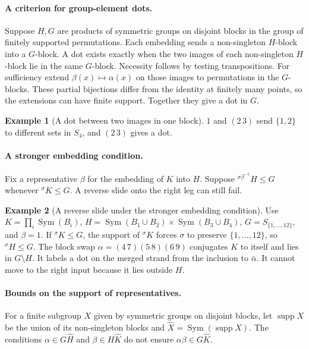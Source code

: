 \documentclass[11pt,a4paper]{article}
\numberwithin{equation}{section}
\theoremstyle{definition}
\newtheorem{example}{Example}[section]
\newcommand{\cg}[2]{{}^{#1}\!#2}
\begin{document}
\paragraph{A criterion for group-element dots.}
Suppose \(H,G\) are products of symmetric groups on disjoint
blocks in the group of finitely supported permutations. Each
embedding sends a non-singleton \(H\)-block into a \(G\)-block.
A dot exists exactly when the two images of each non-singleton
\(H\)-block lie in the same \(G\)-block. Necessity follows by
testing transpositions. For sufficiency extend
\(\beta(x)\mapsto\alpha(x)\) on those images to permutations in
the \(G\)-blocks. These partial bijections differ from the
identity at finitely many points, so the extensions can have
finite support. Together they give a dot in \(G\).


\begin{example}[A dot between two images in one block]\label{ex:dot-in-one-block}
\(1\) and \((2\,3)\) send \(\{1,2\}\) to different
sets in \(S_4\), and \((2\,3)\) gives a dot.
\end{example}

\paragraph{A stronger embedding condition.}
Fix a representative \(\beta\) for the embedding of \(K\) into \(H\).
Suppose \(\cg{\sigma\beta^{-1}}{H}\le G\) whenever
\(\cg{\sigma}{K}\le G\). A reverse slide onto the right leg
can still fail.

\begin{example}[A reverse slide under the stronger embedding condition]\label{ex:stronger-slide-obstruction}
Use
\(K=\prod_i\operatorname{Sym}(B_i)\),
\(H=\operatorname{Sym}(B_1\cup B_2)\times\operatorname{Sym}(B_3\cup B_4)\),
\(G=S_{\{1,\ldots,12\}}\), and \(\beta=1\). If
\(\cg{\sigma}{K}\le G\), the support of \(\cg{\sigma}{K}\) forces
\(\sigma\) to preserve \(\{1,\ldots,12\}\), so
\(\cg{\sigma}{H}\le G\). The block swap \(\alpha=(4\,7)(5\,8)(6\,9)\)
conjugates \(K\) to itself and lies in \(G\setminus H\).
It labels a dot on the merged strand from the inclusion to
\(\bar\alpha\). It cannot move to the right input because it lies
outside \(H\).
\end{example}

\paragraph{Bounds on the support of representatives.}
For a finite subgroup \(X\) given by symmetric groups on disjoint
blocks, let \(\operatorname{supp}X\) be the union of its non-singleton blocks
and \(\widehat X=\operatorname{Sym}(\operatorname{supp}X)\). The conditions
\(\alpha\in G\widehat H\) and \(\beta\in H\widehat K\) do not ensure
\(\alpha\beta\in G\widehat K\).
\end{document}
